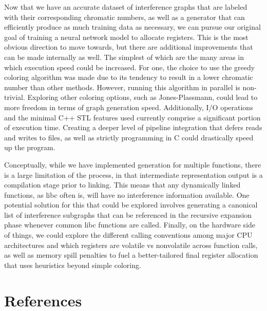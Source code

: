 \documentclass{article}
\begin{document}
Now that we have an accurate dataset of interference graphs that are labeled with their corresponding chromatic numbers, as well as a generator that can efficiently produce as much training data as necessary, we can pursue our original goal of training a neural network model to allocate registers. This is the most obvious direction to move towards, but there are additional improvements that can be made internally as well. The simplest of which are the many areas in which execution speed could be increased. For one, the choice to use the greedy coloring algorithm was made due to its tendency to result in a lower chromatic number than other methods. However, running this algorithm in parallel is non-trivial. Exploring other coloring options, such as Jones-Plassmann, could lead to more freedom in terms of graph generation speed. Additionally, I/O operations and the minimal C++ STL features used currently comprise a significant portion of execution time. Creating a deeper level of pipeline integration that defers reads and writes to files, as well as strictly programming in C could drastically speed up the program. 

Conceptually, while we have implemented generation for multiple functions, there is a large limitation of the process, in that intermediate representation output is a compilation stage prior to linking. This means that any dynamically linked functions, as libc often is, will have no interference information available. One potential solution for this that could be explored involves generating a canonical list of interference subgraphs that can be referenced in the recursive expansion phase whenever common libc functions are called. Finally, on the hardware side of things, we could explore the different calling conventions among major CPU architectures and which registers are volatile vs nonvolatile across function calls, as well as memory spill penalties to fuel a better-tailored final register allocation that uses heuristics beyond simple coloring.

\section*{References}

\small
\end{document}

